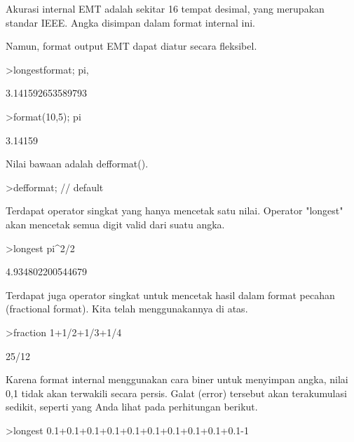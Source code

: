 \documentclass{article}
\newenvironment{eulernotebook}{\par}{\par}
\newenvironment{eulercomment}{\par\medskip}{\par\medskip}
\begin{document}
\begin{eulernotebook}
\begin{eulercomment}
Akurasi internal EMT adalah sekitar 16 tempat desimal, yang merupakan
standar IEEE. Angka disimpan dalam format internal ini.

Namun, format output EMT dapat diatur secara fleksibel.
\end{eulercomment}
\begin{eulerprompt}
>longestformat; pi,
\end{eulerprompt}
\begin{euleroutput}
  3.141592653589793
\end{euleroutput}
\begin{eulerprompt}
>format(10,5); pi
\end{eulerprompt}
\begin{euleroutput}
    3.14159 
\end{euleroutput}
\begin{eulercomment}
Nilai bawaan adalah defformat().
\end{eulercomment}
\begin{eulerprompt}
>defformat; // default
\end{eulerprompt}
\begin{eulercomment}
Terdapat operator singkat yang hanya mencetak satu nilai. Operator
"longest" akan mencetak semua digit valid dari suatu angka.
\end{eulercomment}
\begin{eulerprompt}
>longest pi^2/2
\end{eulerprompt}
\begin{euleroutput}
        4.934802200544679 
\end{euleroutput}
\begin{eulercomment}
Terdapat juga operator singkat untuk mencetak hasil dalam format
pecahan (fractional format). Kita telah menggunakannya di atas.
\end{eulercomment}
\begin{eulerprompt}
>fraction 1+1/2+1/3+1/4
\end{eulerprompt}
\begin{euleroutput}
  25/12
\end{euleroutput}
\begin{eulercomment}
Karena format internal menggunakan cara biner untuk menyimpan angka,
nilai 0,1 tidak akan terwakili secara persis. Galat (error) tersebut
akan terakumulasi sedikit, seperti yang Anda lihat pada perhitungan
berikut.
\end{eulercomment}
\begin{eulerprompt}
>longest 0.1+0.1+0.1+0.1+0.1+0.1+0.1+0.1+0.1+0.1-1

\end{eulerprompt}
\end{eulernotebook}
\end{document}
